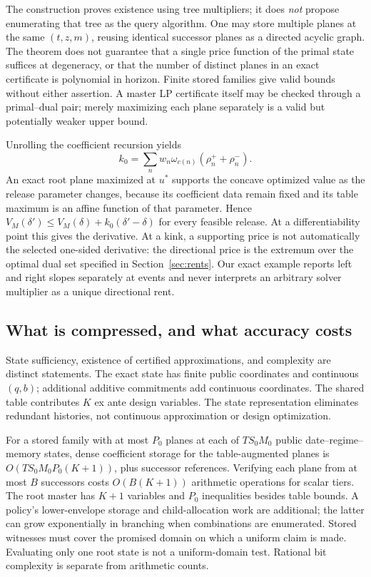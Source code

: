 The construction proves existence using tree multipliers; it does \emph{not} propose enumerating that tree as the query algorithm. One may store multiple planes at the same $(t,z,m)$, reusing identical successor planes as a directed acyclic graph. The theorem does not guarantee that a single price function of the primal state suffices at degeneracy, or that the number of distinct planes in an exact certificate is polynomial in horizon. Finite stored families give valid bounds without either assertion. A master LP certificate itself may be checked through a primal--dual pair; merely maximizing each plane separately is a valid but potentially weaker upper bound.

Unrolling the coefficient recursion yields
\[
 k_0=\sum_nw_n\omega_{c(n)}(\rho_n^++\rho_n^-).
\]
An exact root plane maximized at $u^*$ supports the concave optimized value as the release parameter changes, because its coefficient data remain fixed and its table maximum is an affine function of that parameter. Hence $V_M(\delta')\leq V_M(\delta)+k_0(\delta'-\delta)$ for every feasible release. At a differentiability point this gives the derivative. At a kink, a supporting price is not automatically the selected one-sided derivative: the directional price is the extremum over the optimal dual set specified in Section~\ref{sec:rents}. Our exact example reports left and right slopes separately at events and never interprets an arbitrary solver multiplier as a unique directional rent.

\subsection{What is compressed, and what accuracy costs}\label{ec:accuracy}
State sufficiency, existence of certified approximations, and complexity are distinct statements. The exact state has finite public coordinates and continuous $(q,b)$; additional additive commitments add continuous coordinates. The shared table contributes $K$ ex ante design variables. The state representation eliminates redundant histories, not continuous approximation or design optimization.

For a stored family with at most $P_0$ planes at each of $TS_0M_0$ public date--regime--memory states, dense coefficient storage for the table-augmented planes is $O(TS_0M_0P_0(K+1))$, plus successor references. Verifying each plane from at most $B$ successors costs $O(B(K+1))$ arithmetic operations for scalar tiers. The root master has $K+1$ variables and $P_0$ inequalities besides table bounds. A policy's lower-envelope storage and child-allocation work are additional; the latter can grow exponentially in branching when combinations are enumerated. Stored witnesses must cover the promised domain on which a uniform claim is made. Evaluating only one root state is not a uniform-domain test. Rational bit complexity is separate from arithmetic counts.

